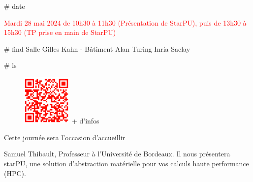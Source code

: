 \documentclass[final]{beamer}
\newlength{\twocolwid}
\begin{document}
\begin{frame}[t]
\begin{columns}[t]
\begin{column}{\twocolwid}
\begin{block}{\# date}

{\textcolor{red}{
     Mardi 28 mai 2024 de 10h30 \`{a} 11h30 (Pr\'{e}sentation de StarPU),
    puis de 13h30 \`{a} 15h30 (TP prise en main de StarPU)
}}

\end{block}


\begin{block}{\# find}
     Salle Gilles Kahn - B\^{a}timent Alan Turing Inria Saclay
\end{block}

\begin{block}{\# ls}

\begin{figure}
\centering
\vspace{-0.75in}
\includegraphics[width=0.22\textwidth]{qrcode.png}\newline
+ d'infos
\end{figure}

     Cette journ\'{e}e sera l'occasion d'accueillir 


Samuel Thibault, Professeur \`{a} l'Université de Bordeaux. Il nous pr\'{e}sentera
starPU, une solution d'abstraction mat\'{e}rielle pour vos calculs haute performance (HPC).

\vspace{1.in}

\end{block}







\end{column}
\end{columns}
\end{frame}
\end{document}
